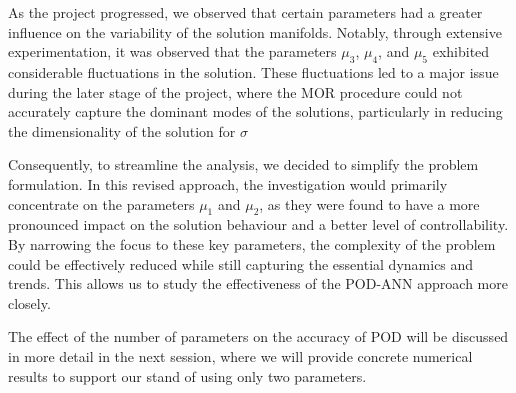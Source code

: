 As the project progressed, we observed that certain parameters had a greater influence on the variability of the solution manifolds. Notably, through extensive experimentation, it was observed that the parameters $\mu_3$, $\mu_4$, and $\mu_5$ exhibited considerable fluctuations in the solution. These fluctuations led to a major issue during the later stage of the project, where the MOR procedure could not accurately capture the dominant modes of the solutions, particularly in reducing the dimensionality of the solution for $\sigma$

Consequently, to streamline the analysis, we decided to simplify the problem formulation. In this revised approach, the investigation would primarily concentrate on the parameters $\mu_1$ and $\mu_2$, as they were found to have a more pronounced impact on the solution behaviour and a better level of controllability. By narrowing the focus to these key parameters, the complexity of the problem could be effectively reduced while still capturing the essential dynamics and trends. This allows us to study the effectiveness of the POD-ANN approach more closely. 

The effect of the number of parameters on the accuracy of POD will be discussed in more detail in the next session, where we will provide concrete numerical results to support our stand of using only two parameters.



\newpage